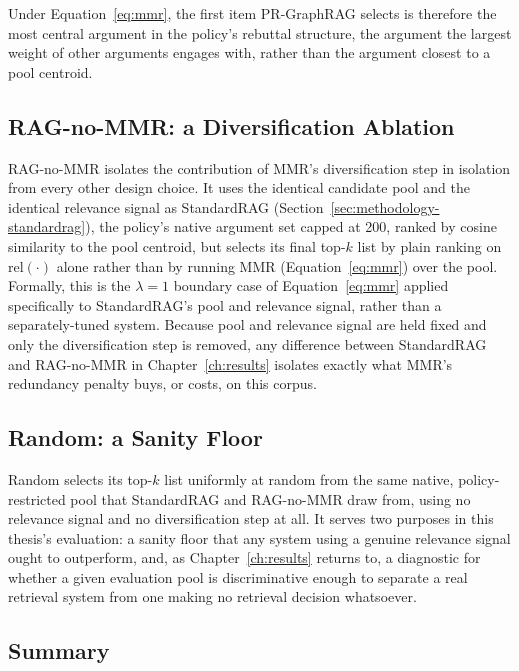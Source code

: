 Under Equation~\ref{eq:mmr}, the first item PR-GraphRAG selects is therefore the most central
argument in the policy's rebuttal structure, the argument the largest weight of other arguments
engages with, rather than the argument closest to a pool centroid.

\subsection{RAG-no-MMR: a Diversification Ablation}
\label{sec:methodology-ragnommr}

RAG-no-MMR isolates the contribution of MMR's diversification step in isolation from every other
design choice. It uses the identical candidate pool and the identical relevance signal as
StandardRAG (Section~\ref{sec:methodology-standardrag}), the policy's native argument set capped
at 200, ranked by cosine similarity to the pool centroid, but selects its final top-$k$ list by
plain ranking on $\mathrm{rel}(\cdot)$ alone rather than by running MMR (Equation~\ref{eq:mmr})
over the pool. Formally, this is the $\lambda = 1$ boundary
case of Equation~\ref{eq:mmr} applied specifically to StandardRAG's pool and relevance signal,
rather than a separately-tuned system. Because pool and relevance signal are held fixed and only
the diversification step is removed, any difference between StandardRAG and RAG-no-MMR in
Chapter~\ref{ch:results} isolates exactly what MMR's redundancy penalty buys, or costs, on this
corpus.

\subsection{Random: a Sanity Floor}
\label{sec:methodology-random}

Random selects its top-$k$ list uniformly at random from the same native, policy-restricted pool
that StandardRAG and RAG-no-MMR draw from, using no relevance signal and no diversification step
at all. It serves two purposes in this thesis's evaluation: a sanity floor that any system using a
genuine relevance signal ought to outperform, and, as Chapter~\ref{ch:results} returns to, a
diagnostic for whether a given evaluation pool is discriminative enough to separate a real
retrieval system from one making no retrieval decision whatsoever.

\subsection{Summary}
\label{sec:methodology-systems-summary}

